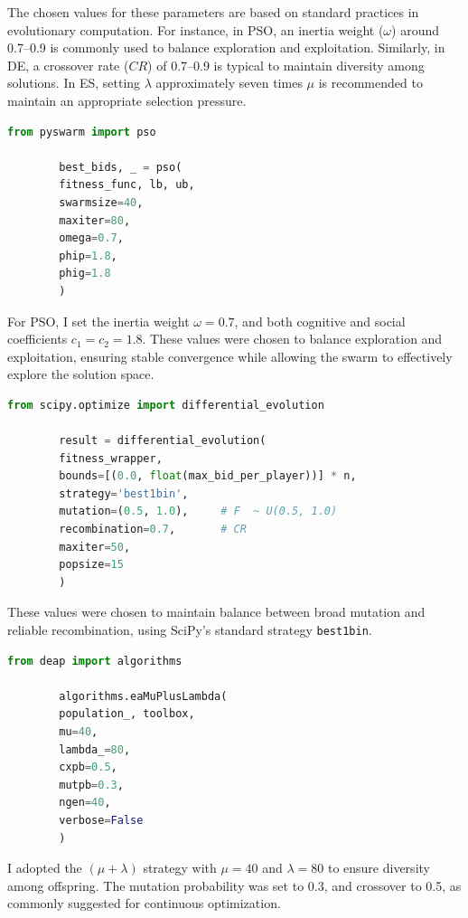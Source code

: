 \documentclass[sigconf]{acmart}
\begin{document}
	
	
	The chosen values for these parameters are based on standard practices in evolutionary computation. For instance, in PSO, an inertia weight ($\omega$) around 0.7–0.9 is commonly used to balance exploration and exploitation. Similarly, in DE, a crossover rate ($CR$) of 0.7–0.9 is typical to maintain diversity among solutions. In ES, setting $\lambda$ approximately seven times $\mu$ is recommended to maintain an appropriate selection pressure.
	
	\begin{lstlisting}[language=Python, caption=PSO parameter setup with pyswarm]
		from pyswarm import pso
		
		best_bids, _ = pso(
		fitness_func, lb, ub,
		swarmsize=40,
		maxiter=80,
		omega=0.7,
		phip=1.8,
		phig=1.8
		)
	\end{lstlisting}
	
	For PSO, I set the inertia weight $\omega = 0.7$, and both cognitive and social coefficients $c_1 = c_2 = 1.8$. These values were chosen to balance exploration and exploitation, ensuring stable convergence while allowing the swarm to effectively explore the solution space.
	
	
	\begin{lstlisting}[language=Python, caption=DE parameter setup with SciPy]
		from scipy.optimize import differential_evolution
		
		result = differential_evolution(
		fitness_wrapper,
		bounds=[(0.0, float(max_bid_per_player))] * n,
		strategy='best1bin',
		mutation=(0.5, 1.0),     # F  ~ U(0.5, 1.0)
		recombination=0.7,       # CR
		maxiter=50,
		popsize=15
		)
	\end{lstlisting}
	
	
	These values were chosen to maintain balance between broad mutation and reliable recombination, using SciPy’s standard strategy \texttt{best1bin}.
	
	
	\begin{lstlisting}[language=Python, caption=ES setup with DEAP using ($\mu$$+$$\lambda$)]
		from deap import algorithms
		
		algorithms.eaMuPlusLambda(
		population_, toolbox,
		mu=40,
		lambda_=80,
		cxpb=0.5,
		mutpb=0.3,
		ngen=40,
		verbose=False
		)
	\end{lstlisting}
	I adopted the $(\mu + \lambda)$ strategy with $\mu=40$ and $\lambda=80$ to ensure diversity among offspring. The mutation probability was set to 0.3, and crossover to 0.5, as commonly suggested for continuous optimization.
	
\end{document}
